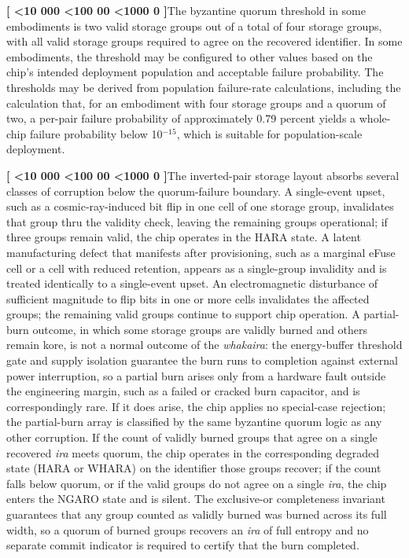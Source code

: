 \documentclass[12pt,letterpaper]{article}
\newcounter{para}
\newcommand{\padzero}{%
  \ifnum\value{para}<10 000\else%
  \ifnum\value{para}<100 00\else%
  \ifnum\value{para}<1000 0\else%
  \fi\fi\fi}
\newcommand{\para}{%
  \refstepcounter{para}\noindent\textbf{[\padzero\arabic{para}]}\hspace{0.5em}\ignorespaces}
\newcounter{fig}
\begin{document}
\para The byzantine quorum threshold in some embodiments is two valid storage groups out of a total of four storage groups, with all valid storage groups required to agree on the recovered identifier. In some embodiments, the threshold may be configured to other values based on the chip's intended deployment population and acceptable failure probability. The thresholds may be derived from population failure-rate calculations, including the calculation that, for an embodiment with four storage groups and a quorum of two, a per-pair failure probability of approximately 0.79 percent yields a whole-chip failure probability below 10${}^{-15}$, which is suitable for population-scale deployment.

\para The inverted-pair storage layout absorbs several classes of corruption below the quorum-failure boundary. A single-event upset, such as a cosmic-ray-induced bit flip in one cell of one storage group, invalidates that group thru the validity check, leaving the remaining groups operational; if three groups remain valid, the chip operates in the HARA state. A latent manufacturing defect that manifests after provisioning, such as a marginal eFuse cell or a cell with reduced retention, appears as a single-group invalidity and is treated identically to a single-event upset. An electromagnetic disturbance of sufficient magnitude to flip bits in one or more cells invalidates the affected groups; the remaining valid groups continue to support chip operation. A partial-burn outcome, in which some storage groups are validly burned and others remain kore, is not a normal outcome of the \emph{whakaira}: the energy-buffer threshold gate and supply isolation guarantee the burn runs to completion against external power interruption, so a partial burn arises only from a hardware fault outside the engineering margin, such as a failed or cracked burn capacitor, and is correspondingly rare. If it does arise, the chip applies no special-case rejection; the partial-burn array is classified by the same byzantine quorum logic as any other corruption. If the count of validly burned groups that agree on a single recovered \emph{ira} meets quorum, the chip operates in the corresponding degraded state (HARA or WHARA) on the identifier those groups recover; if the count falls below quorum, or if the valid groups do not agree on a single \emph{ira}, the chip enters the NGARO state and is silent. The exclusive-or completeness invariant guarantees that any group counted as validly burned was burned across its full width, so a quorum of burned groups recovers an \emph{ira} of full entropy and no separate commit indicator is required to certify that the burn completed.
\end{document}
